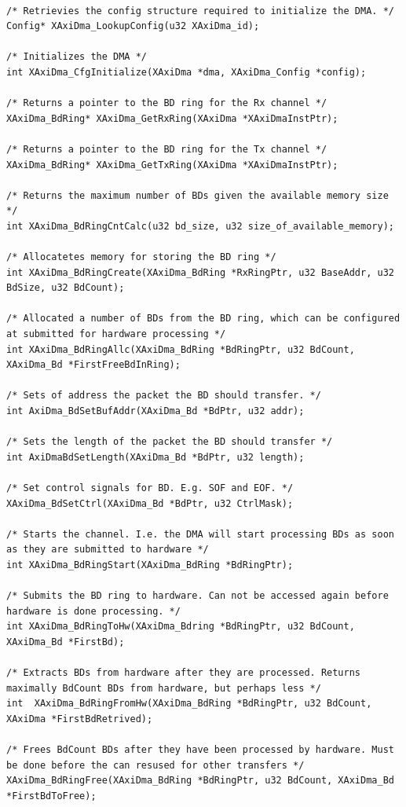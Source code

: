 \begin{lstlisting}[caption={XAxiDma driver interface},label=dma_interface]

/* Retrievies the config structure required to initialize the DMA. */
Config* XAxiDma_LookupConfig(u32 XAxiDma_id);

/* Initializes the DMA */
int XAxiDma_CfgInitialize(XAxiDma *dma, XAxiDma_Config *config);

/* Returns a pointer to the BD ring for the Rx channel */
XAxiDma_BdRing* XAxiDma_GetRxRing(XAxiDma *XAxiDmaInstPtr);

/* Returns a pointer to the BD ring for the Tx channel */
XAxiDma_BdRing* XAxiDma_GetTxRing(XAxiDma *XAxiDmaInstPtr);

/* Returns the maximum number of BDs given the available memory size */
int XAxiDma_BdRingCntCalc(u32 bd_size, u32 size_of_available_memory);

/* Allocatetes memory for storing the BD ring */
int XAxiDma_BdRingCreate(XAxiDma_BdRing *RxRingPtr, u32 BaseAddr, u32 BdSize, u32 BdCount);

/* Allocated a number of BDs from the BD ring, which can be configured at submitted for hardware processing */
int XAxiDma_BdRingAllc(XAxiDma_BdRing *BdRingPtr, u32 BdCount, XAxiDma_Bd *FirstFreeBdInRing);

/* Sets of address the packet the BD should transfer. */
int AxiDma_BdSetBufAddr(XAxiDma_Bd *BdPtr, u32 addr);

/* Sets the length of the packet the BD should transfer */
int AxiDmaBdSetLength(XAxiDma_Bd *BdPtr, u32 length);

/* Set control signals for BD. E.g. SOF and EOF. */
XAxiDma_BdSetCtrl(XAxiDma_Bd *BdPtr, u32 CtrlMask);

/* Starts the channel. I.e. the DMA will start processing BDs as soon as they are submitted to hardware */
int XAxiDma_BdRingStart(XAxiDma_BdRing *BdRingPtr);

/* Submits the BD ring to hardware. Can not be accessed again before hardware is done processing. */
int XAxiDma_BdRingToHw(XAxiDma_Bdring *BdRingPtr, u32 BdCount, XAxiDma_Bd *FirstBd);

/* Extracts BDs from hardware after they are processed. Returns maximally BdCount BDs from hardware, but perhaps less */
int  XAxiDma_BdRingFromHw(XAxiDma_BdRing *BdRingPtr, u32 BdCount, XAxiDma *FirstBdRetrived);

/* Frees BdCount BDs after they have been processed by hardware. Must be done before the can resused for other transfers */
XAxiDma_BdRingFree(XAxiDma_BdRing *BdRingPtr, u32 BdCount, XAxiDma_Bd *FirstBdToFree);
\end{lstlisting}


